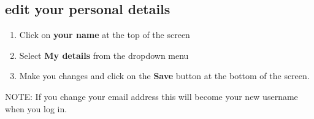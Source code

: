 \documentclass{ctrlo-int-toc}
\begin{document}
\subsection[edit your personal details]{edit your personal details}
\begin{enumerate}
\item Click on \textbf{your name} at the top of the screen
\item Select \textbf{My details} from the dropdown menu
\item Make you changes and click on the \textbf{Save} button at the bottom of the screen. 
\end{enumerate}
\begin{notebox}
NOTE: If you change your email address this will become your new username when you log in. 
\end{notebox}
\end{document}
